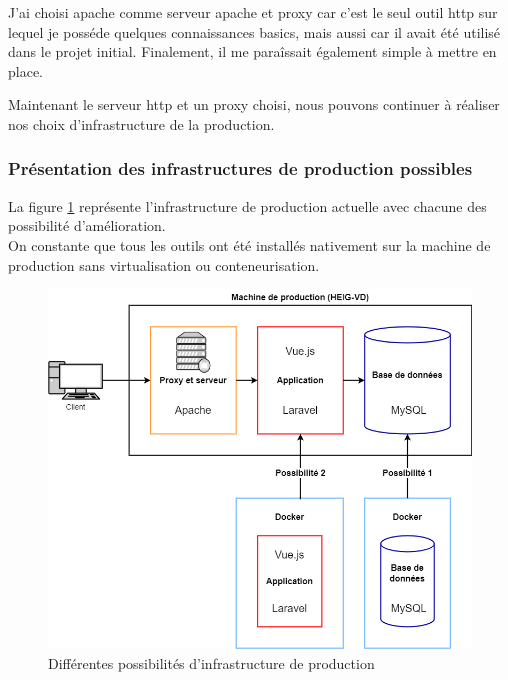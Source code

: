 \documentclass[
    iai, %
    il, %
]{heig-tb}
\begin{document}
J'ai choisi \Gls{apache} comme serveur \Gls{apache} et \Gls{proxy} car c'est le seul outil \Gls{http} sur lequel je posséde quelques connaissances basics, mais aussi car il avait été utilisé dans le projet initial. Finalement, il me paraîssait également simple à mettre en place.

Maintenant le serveur \Gls{http} et un \Gls{proxy} choisi, nous pouvons continuer à réaliser nos choix d'infrastructure de la production.

\subsubsection{Présentation des infrastructures de production possibles}

La figure \ref{infrastructure-prod-choix.drawio} représente l'infrastructure de production actuelle avec chacune des possibilité d'amélioration. \\
On constante que tous les outils ont été installés nativement sur la machine de production sans virtualisation ou conteneurisation.

\begin{center}
    \begin{figure}[H]
        \includegraphics[width=\textwidth]{./assets/figures/infrastructure-prod-choix.drawio.png}
        \caption{Différentes possibilités d'infrastructure de production \label{infrastructure-prod-choix.drawio}}
    \end{figure}
\end{center}
\end{document}
